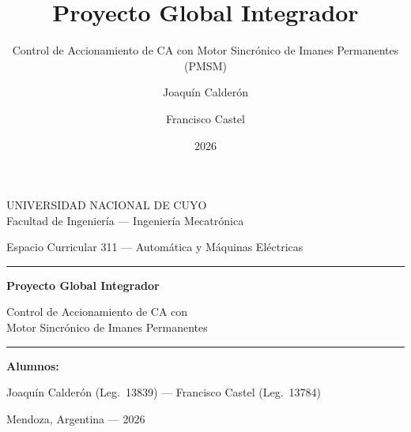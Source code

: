 \documentclass[aspectratio=169,t]{beamer}
\title{Proyecto Global Integrador}
\subtitle{Control de Accionamiento de CA con Motor Sincrónico de Imanes Permanentes (PMSM)}
\author{Joaquín Calderón \and Francisco Castel}
\institute{UNCuyo --- Facultad de Ingeniería --- Ingeniería Mecatrónica\\
Espacio Curricular 311: Automática y Máquinas Eléctricas}
\date{2026}
\begin{document}
\begin{frame}[plain]
  \centering
  \vspace{4mm}
  {\small UNIVERSIDAD NACIONAL DE CUYO\\
  Facultad de Ingeniería --- Ingeniería Mecatrónica\par}

  \vspace{3mm}
  {\small\color{uncGray} Espacio Curricular 311 --- Automática y Máquinas Eléctricas\par}

  \vspace{5mm}
  \rule{0.85\textwidth}{1pt}

  \vspace{5mm}
  {\huge\bfseries\color{uncBlue} Proyecto Global Integrador\par}

  \vspace{3mm}
  {\Large Control de Accionamiento de CA con\\Motor Sincrónico de Imanes Permanentes\par}

  \vspace{4mm}
  \rule{0.85\textwidth}{1pt}

  \vspace{3mm}
  {\large \textbf{Alumnos:}\par}
  \vspace{1mm}
  {\normalsize Joaquín Calderón \quad (Leg.\ 13839) \quad --- \quad Francisco Castel \quad (Leg.\ 13784)\par}

  \vspace{3mm}
  {\normalsize Mendoza, Argentina --- 2026\par}
\end{frame}
\end{document}
